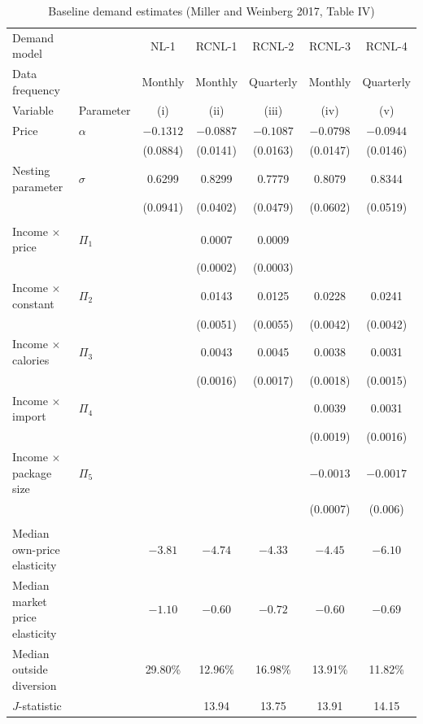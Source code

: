 \begin{table}[htbp]
\centering
\caption{Baseline demand estimates (Miller and Weinberg 2017, Table IV)}
\label{tab:11-mw-demand}
\footnotesize
\begin{tabular}{@{}llccccc@{}}
\toprule
Demand model & & NL-1 & RCNL-1 & RCNL-2 & RCNL-3 & RCNL-4 \\
Data frequency & & Monthly & Monthly & Quarterly & Monthly & Quarterly \\
Variable & Parameter & (i) & (ii) & (iii) & (iv) & (v) \\
\midrule
Price & $\alpha$ & $-0.1312$ & $-0.0887$ & $-0.1087$ & $-0.0798$ & $-0.0944$ \\
 & & (0.0884) & (0.0141) & (0.0163) & (0.0147) & (0.0146) \\
Nesting parameter & $\sigma$ & 0.6299 & 0.8299 & 0.7779 & 0.8079 & 0.8344 \\
 & & (0.0941) & (0.0402) & (0.0479) & (0.0602) & (0.0519) \\
\addlinespace
\multicolumn{7}{@{}l}{\textit{Demographic interactions}} \\
Income $\times$ price & $\Pi_1$ & & 0.0007 & 0.0009 & & \\
 & & & (0.0002) & (0.0003) & & \\
Income $\times$ constant & $\Pi_2$ & & 0.0143 & 0.0125 & 0.0228 & 0.0241 \\
 & & & (0.0051) & (0.0055) & (0.0042) & (0.0042) \\
Income $\times$ calories & $\Pi_3$ & & 0.0043 & 0.0045 & 0.0038 & 0.0031 \\
 & & & (0.0016) & (0.0017) & (0.0018) & (0.0015) \\
Income $\times$ import & $\Pi_4$ & & & & 0.0039 & 0.0031 \\
 & & & & & (0.0019) & (0.0016) \\
Income $\times$ package size & $\Pi_5$ & & & & $-0.0013$ & $-0.0017$ \\
 & & & & & (0.0007) & (0.006) \\
\addlinespace
\multicolumn{7}{@{}l}{\textit{Other statistics}} \\
Median own-price elasticity & & $-3.81$ & $-4.74$ & $-4.33$ & $-4.45$ & $-6.10$ \\
Median market price elasticity & & $-1.10$ & $-0.60$ & $-0.72$ & $-0.60$ & $-0.69$ \\
Median outside diversion & & 29.80\% & 12.96\% & 16.98\% & 13.91\% & 11.82\% \\
$J$-statistic & & & 13.94 & 13.75 & 13.91 & 14.15 \\
\bottomrule
\end{tabular}


\end{table}
